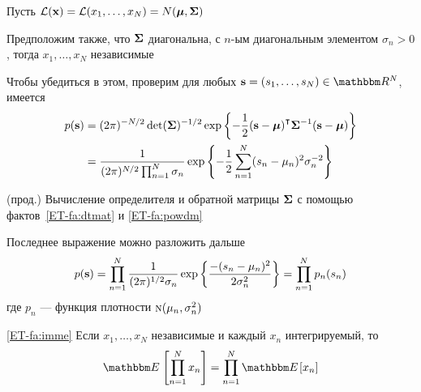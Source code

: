 \begin{frame}

    \vspace{2em}
    \Eg 
    
    Пусть $\mathcal L({\mathbf x}) = \mathcal L(x_1, \ldots, x_N) = N({\boldsymbol \mu}, {\boldsymbol \Sigma})$ 
    
    Предположим также, что 
    ${\boldsymbol \Sigma}$ диагональна, с $n$-ым диагональным элементом
    $\sigma_n > 0$, тогда $x_1, \ldots, x_N$ независимые
    
    Чтобы убедиться в этом, проверим для любых
    $\bolds = (s_1, \ldots, s_N) \in \RR^N$, имеется
    \begin{align*}
        p(\bolds) 
        & = (2 \pi)^{-N/2} \determinant (\boldSigma)^{-1/2} 
        \exp \left\{ 
            - \frac{1}{2} (\bolds - \boldmu)^\T \boldSigma^{-1} (\bolds - \boldmu) 
        \right\}
        \\
        & = \frac{1}{(2 \pi)^{N/2} \prod_{n=1}^N \sigma_n}
        \exp \left\{ 
            - \frac{1}{2} \sum_{n=1}^N (s_n - \mu_n)^2 \sigma_n^{-2}
        \right\}
    \end{align*}
    
\end{frame}

\begin{frame}

    \vspace{2em}
    \Eg (прод.)
    Вычисление определителя и обратной матрицы ${\boldsymbol \Sigma}$ с 
    помощью фактов~\ref{ET-fa:dtmat} и \ref{ET-fa:powdm}
    
    Последнее выражение можно разложить дальше
    \begin{equation*}
        p({\mathbf s}) 
        =
        \prod_{n=1}^N \frac{1}{(2 \pi)^{1/2} \sigma_n}
            \exp \left\{ 
                \frac{-(s_n - \mu_n)^2}{2 \sigma_n^2}
            \right\}
         =
        \prod_{n=1}^N p_n(s_n)
    \end{equation*}
    где $p_n$ --- функция плотности $\textrm{\sc n}(\mu_n, \sigma^2_n)$

\end{frame}

\begin{frame}

    \vspace{2em}
    \Fact\eqref{ET-fa:imme}
   Если $x_1, \ldots, x_N$ независимые и каждый $x_n$ интегрируемый, то
   \begin{equation*}
       \EE \left[ \prod_{n=1}^N x_n \right]
       = \prod_{n=1}^N \EE[ x_n ]
   \end{equation*}
\end{frame}

